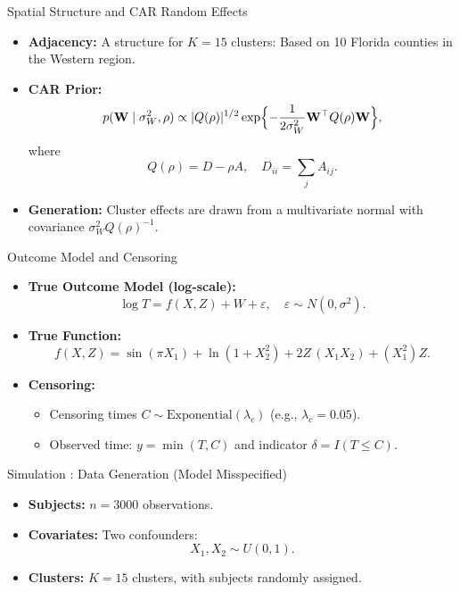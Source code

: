 \documentclass{beamer}
\begin{document}
  \begin{frame}{Spatial Structure and CAR Random Effects}
    \begin{itemize}
      \item \textbf{Adjacency:} A structure for \(K=15\) clusters: Based on 10 Florida counties in the Western region.
      \item \textbf{CAR Prior:}
        \[
        p(\mathbf{W}\mid\sigma^2_W,\rho) \propto |Q(\rho)|^{1/2}\exp\Bigl\{-\frac{1}{2\sigma^2_W}\mathbf{W}^\top Q(\rho)\mathbf{W}\Bigr\},
        \]
        where
        \[
        Q(\rho)=D-\rho A,\quad D_{ii}=\sum_j A_{ij}.
        \]
      \item \textbf{Generation:} Cluster effects are drawn from a multivariate normal with covariance \(\sigma^2_W Q(\rho)^{-1}\).
    \end{itemize}
  \end{frame}
  
  \begin{frame}{Outcome Model and Censoring}
    \begin{itemize}
      \item \textbf{True Outcome Model (log-scale):}
        \[
        \log T = f(X,Z) + W + \varepsilon,\quad \varepsilon\sim N(0,\sigma^2).
        \]
      \item \textbf{True Function:}
        \[
        f(X,Z) = \sin(\pi X_1) + \ln(1+X_2^2) + 2Z\,(X_1X_2) + (X_1^2)Z.
        \]

      \item \textbf{Censoring:} 
        \begin{itemize}
          \item Censoring times \(C \sim \text{Exponential}(\lambda_c)\) (e.g., \(\lambda_c=0.05\)).
          \item Observed time: \(y = \min(T, C)\) and indicator \(\delta = I(T\le C)\).
        \end{itemize}
    \end{itemize}
  \end{frame}
  

 

\begin{frame}{Simulation : Data Generation (Model Misspecified)}
    \begin{itemize}
      \item \textbf{Subjects:} \(n = 3000\) observations.
      \item \textbf{Covariates:} Two confounders:
        \[
        X_1, X_2 \sim U(0,1).
        \]
      \item \textbf{Clusters:} \(K = 15\) clusters, with subjects randomly assigned.
    \end{itemize}
  \end{frame}
      
\end{document}
